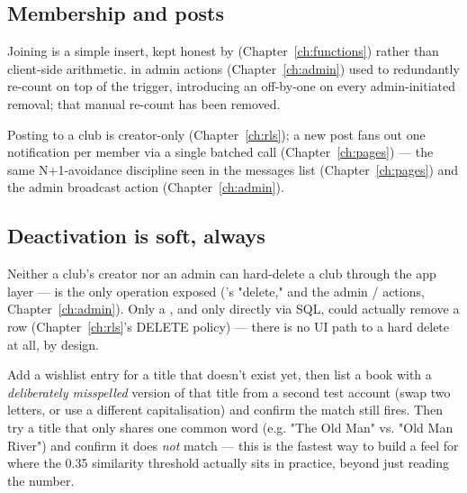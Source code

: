 \subsection*{Membership and posts}

Joining is a simple  insert, kept honest by  (Chapter~\ref{ch:functions}) rather than client-side arithmetic.  in admin actions (Chapter~\ref{ch:admin}) used to redundantly re-count on top of the trigger, introducing an off-by-one on every admin-initiated removal; that manual re-count has been removed.

Posting to a club is creator-only (Chapter~\ref{ch:rls}); a new post fans out one notification per member via a single batched  call (Chapter~\ref{ch:pages}) — the same N+1-avoidance discipline seen in the messages list (Chapter~\ref{ch:pages}) and the admin broadcast action (Chapter~\ref{ch:admin}).

\subsection*{Deactivation is soft, always}

Neither a club's creator nor an admin can hard-delete a club through the app layer —  is the only operation exposed ('s "delete," and the admin / actions, Chapter~\ref{ch:admin}). Only a , and only directly via SQL, could actually remove a  row (Chapter~\ref{ch:rls}'s DELETE policy) — there is no UI path to a hard delete at all, by design.

\begin{olktask}
Add a wishlist entry for a title that doesn't exist yet, then list a book with a \emph{deliberately misspelled} version of that title from a second test account (swap two letters, or use a different capitalisation) and confirm the match still fires. Then try a title that only shares one common word (e.g. "The Old Man" vs. "Old Man River") and confirm it does \emph{not} match — this is the fastest way to build a feel for where the 0.35 similarity threshold actually sits in practice, beyond just reading the number.
\end{olktask}
